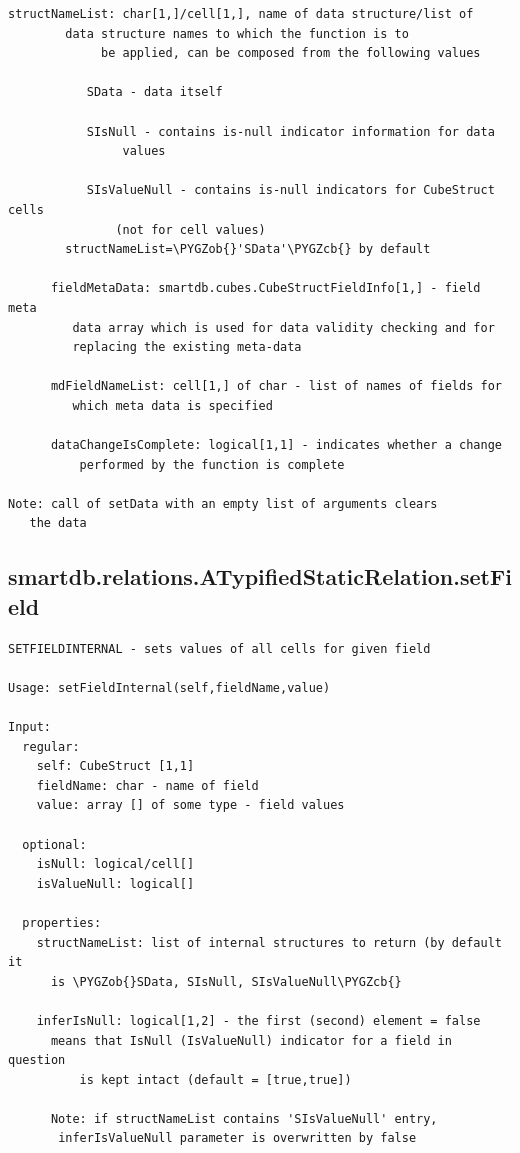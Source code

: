 \documentclass[letterpaper,10pt,english]{sphinxmanual}
\def\PYGZob{\char`\{}
\def\PYGZcb{\char`\}}
\begin{document}
\begin{Verbatim}[commandchars=\\\{\}]
      structNameList: char[1,]/cell[1,], name of data structure/list of
        data structure names to which the function is to
             be applied, can be composed from the following values

           SData - data itself

           SIsNull - contains is-null indicator information for data
                values

           SIsValueNull - contains is-null indicators for CubeStruct cells
               (not for cell values)
        structNameList=\PYGZob{}'SData'\PYGZcb{} by default

      fieldMetaData: smartdb.cubes.CubeStructFieldInfo[1,] - field meta
         data array which is used for data validity checking and for
         replacing the existing meta-data

      mdFieldNameList: cell[1,] of char - list of names of fields for
         which meta data is specified

      dataChangeIsComplete: logical[1,1] - indicates whether a change
          performed by the function is complete

Note: call of setData with an empty list of arguments clears
   the data
\end{Verbatim}


\subsection{smartdb.relations.ATypifiedStaticRelation.setField}
\label{chap_functions:smartdb-relations-atypifiedstaticrelation-setfield}
\begin{Verbatim}[commandchars=\\\{\}]
SETFIELDINTERNAL - sets values of all cells for given field

Usage: setFieldInternal(self,fieldName,value)

Input:
  regular:
    self: CubeStruct [1,1]
    fieldName: char - name of field
    value: array [] of some type - field values

  optional:
    isNull: logical/cell[]
    isValueNull: logical[]

  properties:
    structNameList: list of internal structures to return (by default it
      is \PYGZob{}SData, SIsNull, SIsValueNull\PYGZcb{}

    inferIsNull: logical[1,2] - the first (second) element = false
      means that IsNull (IsValueNull) indicator for a field in question
          is kept intact (default = [true,true])

      Note: if structNameList contains 'SIsValueNull' entry,
       inferIsValueNull parameter is overwritten by false
\end{Verbatim}
\end{document}

